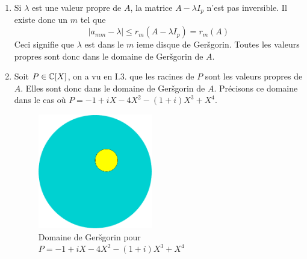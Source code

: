 \begin{enumerate}
\item Si $\lambda$ est une valeur propre de $A$, la matrice $A-\lambda I_p$ n'est pas inversible. Il existe donc un $m$ tel que 
\begin{displaymath}
 |a_{mm}-\lambda|\leq r_m(A-\lambda I_p)=r_m(A)
\end{displaymath}
Ceci signifie que $\lambda$ est dans le $m$ ieme disque de  Ger\v{s}gorin. Toutes les valeurs propres sont donc dans le domaine de  Ger\v{s}gorin de $A$.
\item Soit $P\in\mathbb{C}[X]$, on a vu en I.3. que les racines de $P$ sont les valeurs propres de $A$. Elles sont donc dans le domaine de  Ger\v{s}gorin de $A$.\newline
Précisons ce domaine dans le cas où $P=-1+iX-4X^2-(1+i)X^3+X^4$.
\begin{figure}
 \centering
 \includegraphics[width=5cm]{Cgersg_1.pdf}
 \caption{Domaine de Ger\v{s}gorin pour $P=-1+iX-4X^2-(1+i)X^3+X^4$}
 \label{fig: Cgersg_1}
\end{figure}


\end{enumerate}
